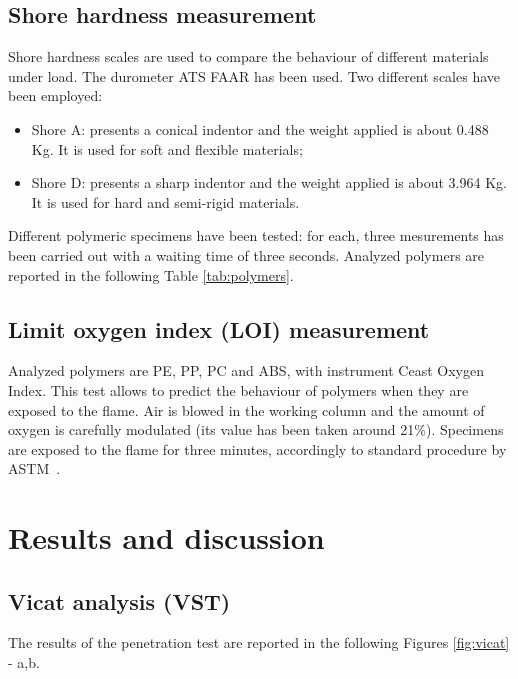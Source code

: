 \documentclass[a4paper, 11pt]{article}
\begin{document}
\subsection{Shore hardness measurement}

Shore hardness scales are used to compare the behaviour of different materials under load. The durometer ATS FAAR has been used.
Two different scales have been employed:
\begin{itemize}
\item Shore A: presents a conical indentor and the weight applied is about 0.488 Kg. It is used for soft and flexible materials;
\item Shore D: presents a sharp indentor and the weight applied is about 3.964 Kg. It is used for hard and semi-rigid materials.

\end{itemize}

Different polymeric specimens have been tested: for each, three mesurements has been carried out with a waiting time of three seconds. Analyzed polymers are reported in the following Table \ref{tab:polymers}.
\subsection{Limit oxygen index (LOI) measurement}

Analyzed polymers are PE, PP, PC and ABS, with instrument Ceast Oxygen Index. This test allows to predict the behaviour of polymers when they are exposed to the flame. Air is blowed in the working column and the amount of oxygen is carefully modulated (its value has been taken around 21\%). Specimens are exposed to the flame for three minutes, accordingly to standard procedure by ASTM~\cite{LOI}.

\section{Results and discussion}

\subsection{Vicat analysis (VST)}

The results of the penetration test are reported in the following Figures \ref{fig:vicat} - a,b.
\end{document}
